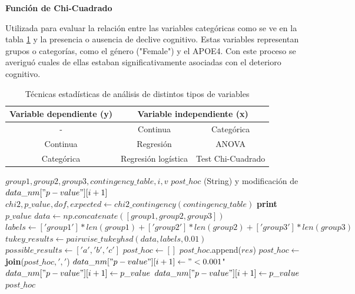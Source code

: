 \begin{description}
	
	\item {\textbf{Función de Chi-Cuadrado}} 
	
	Utilizada para evaluar la relación entre las variables categóricas como se ve en la tabla \ref{tab:tabla5} y la presencia o ausencia de declive cognitivo. Estas variables representan grupos o categorías, como el género ("Female") y el APOE4. Con este proceso se averiguó cuales de ellas estaban significativamente asociadas con el deterioro cognitivo.\\
	
	\begin{table}[t]
		\centering
		\begin{tabular}{|c|c|c|} 
			\toprule
			Variable dependiente (y) & \multicolumn{2}{|c|}{Variable independiente (x)} \\
			\hline
			- &  Continua &  Categórica\\ 
			\hline
			Continua &  Regresión & ANOVA \\
			\hline
			Categórica & Regresión logística &  Test Chi-Cuadrado  \\
			\bottomrule
		\end{tabular}
		\caption{Técnicas estadísticas de análisis de distintos tipos de variables}
		\label{tab:tabla5}
	\end{table}
	
	\begin{algorithm}
		\caption{chi\_square\_with\_posthoc}
		\begin{algorithmic}[1]
			\REQUIRE $group1, group2, group3, contingency\_table, i, v$
			\ENSURE $post\_hoc$ (String) y modificación de $data\_nm["p-value"][i+1]$
			\STATE $chi2, p\_value, dof, expected \leftarrow chi2\_contingency(contingency\_table)$
			\STATE \textbf{print} $p\_value$
			\STATE $data \leftarrow np.concatenate([group1, group2, group3])$
			\STATE $labels \leftarrow ['group1'] * len(group1) + ['group2'] * len(group2) + ['group3'] * len(group3)$
			\STATE $tukey\_results \leftarrow pairwise\_tukeyhsd(data, labels, 0.01)$
			\STATE $possible\_results \leftarrow ['a', 'b', 'c']$
			\STATE $post\_hoc \leftarrow []$
			\STATE $post\_hoc$.append($res$)
			\ENDIF
			\ENDFOR
			\STATE $post\_hoc \leftarrow$ \textbf{join}($post\_hoc, ','$)
			\STATE $data\_nm["p-value"][i+1] \leftarrow "< 0.001$"
			\ELSE
			\STATE $data\_nm["p-value"][i+1] \leftarrow p\_value$
			\ENDIF
			\ELSE
			\STATE $data\_nm["p-value"][i+1] \leftarrow p\_value$
			\ENDIF
			\RETURN $post\_hoc$
		\end{algorithmic}
	\end{algorithm}
	

\end{description}
